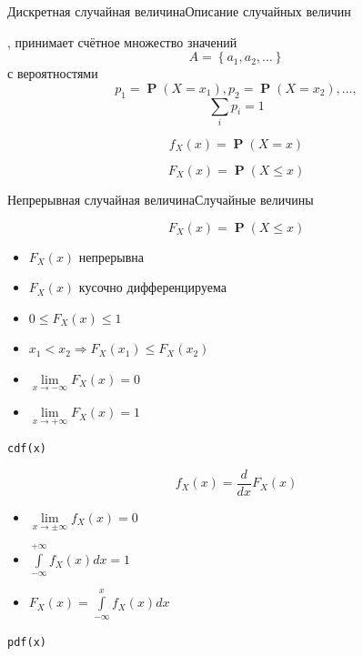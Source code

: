 \documentclass[11pt,pdf,utf8,hyperref={unicode},aspectratio=169]{beamer}
\DeclareMathOperator{\prob}{\mathbf{P}}
\begin{document}
\begin{frame}{Дискретная случайная величина}{Описание случайных величин}

, принимает счётное множество значений
$$
    A = \left\{a_1,a_2,\ldots \right\}
$$
с вероятностями
$$
    p_1=\prob(X=x_1), p_2=\prob(X=x_2),\dots,
$$
$$
    \sum\limits_{i} p_i = 1
$$
\begin{multicols}{2}

    $$
        f_X(x) = \prob\left( X = x \right)
    $$

    $$
        F_X(x) = \prob(X \leqslant x )
    $$
\end{multicols}
\end{frame}
\begin{frame}{Непрерывная случайная величина}{Случайные величины}

\begin{multicols}{2}
    $$
        F_X(x) = \prob(X \leqslant x )
    $$

    \bigskip
    \begin{itemize}
    \item $F_X(x)$ непрерывна
    \item $F_X(x)$ кусочно дифференцируема
    \item  $0 \leqslant F_X(x)\leqslant 1$
    \item  $x_1 < x_2 \Rightarrow F_X(x_1) \leqslant F_X(x_2)$
    \item  $\lim\limits_{x\to -\infty} F_X(x) = 0$
    \item  $\lim\limits_{x\to +\infty} F_X(x) = 1$
    \end{itemize}
     \alert{\texttt{cdf(x)}}
    \columnbreak

    $$
        f_X(x) = \frac{d}{dx}F_X(x)
    $$

    \bigskip
    \begin{itemize}
        \item $\lim\limits_{x\to \pm\infty} f_X(x) = 0$
        \item $\int\limits_{-\infty}^{+\infty}f_X(x)dx = 1$
        \item $F_X(x) = \int\limits_{-\infty}^{x}f_X(x)dx$
    \end{itemize}
     \alert{\texttt{pdf(x)}}
\end{multicols}

\end{frame}
\end{document}
